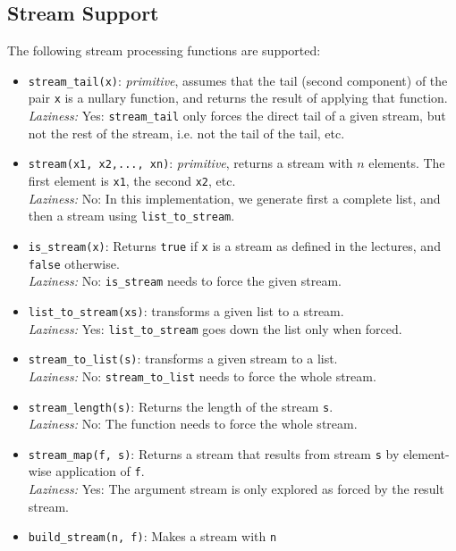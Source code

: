 \subsection*{Stream Support}

The following stream processing functions are supported:

\begin{itemize}
\item \lstinline{stream_tail(x)}: \textit{primitive}, assumes that the tail (second component) of the
  pair \lstinline{x} is a nullary function, and returns the result of
  applying that function.\\
\emph{Laziness:}  Yes: \lstinline{stream_tail} only forces the direct tail of a given
stream,
but not the rest of the stream, i.e. not the tail of the tail, etc.
\item \lstinline{stream(x1, x2,..., xn)}: \textit{primitive}, returns a stream with $n$ elements. The
first element is \lstinline{x1}, the second \lstinline{x2}, etc.\\
\emph{Laziness:}  No: In this implementation, we generate first a
           complete list, and then a stream using \lstinline{list_to_stream}.
\item \lstinline{is_stream(x)}: Returns \lstinline{true} if
  \lstinline{x} is a stream as defined in the lectures, and
  \lstinline{false} otherwise.\\
\emph{Laziness:}  No: \lstinline{is_stream} needs to force the given stream.
\item \lstinline{list_to_stream(xs)}: transforms a given list to a stream.\\
\emph{Laziness:}  Yes: \lstinline{list_to_stream} goes down the list only when forced.
\item \lstinline{stream_to_list(s)}: transforms a given stream to a list.\\
\emph{Laziness:}  No: \lstinline{stream_to_list} needs to force the whole stream.
\item \lstinline{stream_length(s)}: Returns the length of the stream
  \lstinline{s}.\\
\emph{Laziness:}  No: The function needs to force the whole stream.
\item \lstinline{stream_map(f, s)}: Returns a stream that results from stream
  \lstinline{s} by element-wise application of \lstinline{f}.\\
\emph{Laziness:}  Yes: The argument stream is only explored as forced by
           the result stream.
\item \lstinline{build_stream(n, f)}: Makes a stream with \lstinline{n}

\end{itemize}
